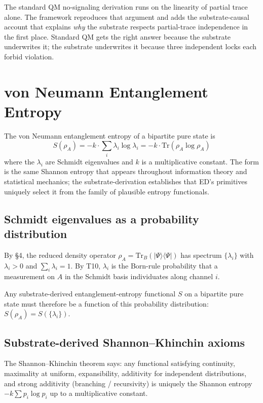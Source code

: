 \documentclass[11pt,a4paper]{article}
\begin{document}
The standard QM no-signaling derivation runs on the linearity of partial trace alone. The framework reproduces that argument and adds the substrate-causal account that explains \emph{why} the substrate respects partial-trace independence in the first place. Standard QM gets the right answer because the substrate underwrites it; the substrate underwrites it because three independent locks each forbid violation.

\section{von Neumann Entanglement Entropy}

The von Neumann entanglement entropy of a bipartite pure state is
\[
S(\rho_A) = -k \cdot \sum_i \lambda_i \log \lambda_i = -k \cdot \mathrm{Tr}(\rho_A \log \rho_A)
\]
where the $\lambda_i$ are Schmidt eigenvalues and $k$ is a multiplicative constant. The form is the same Shannon entropy that appears throughout information theory and statistical mechanics; the substrate-derivation establishes that ED's primitives uniquely select it from the family of plausible entropy functionals.

\subsection{Schmidt eigenvalues as a probability distribution}

By \S4, the reduced density operator $\rho_A = \mathrm{Tr}_B(|\Psi\rangle\langle\Psi|)$ has spectrum $\{\lambda_i\}$ with $\lambda_i > 0$ and $\sum_i \lambda_i = 1$. By T10, $\lambda_i$ is the Born-rule probability that a measurement on $A$ in the Schmidt basis individuates along channel $i$.

Any substrate-derived entanglement-entropy functional $S$ on a bipartite pure state must therefore be a function of this probability distribution: $S(\rho_A) = S(\{\lambda_i\})$.

\subsection{Substrate-derived Shannon--Khinchin axioms}

The Shannon--Khinchin theorem says: any functional satisfying continuity, maximality at uniform, expansibility, additivity for independent distributions, and strong additivity (branching / recursivity) is uniquely the Shannon entropy $-k\sum p_i \log p_i$ up to a multiplicative constant.
\end{document}
